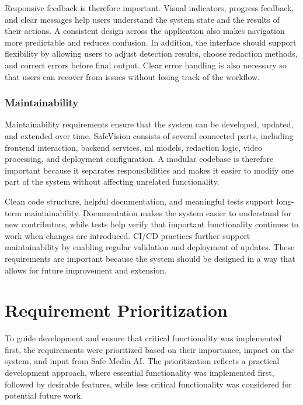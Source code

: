 Responsive feedback is therefore important. Visual indicators, progress feedback, and clear messages help users understand the system state and the results of their actions. A consistent design across the application also makes navigation more predictable and reduces confusion. In addition, the interface should support flexibility by allowing users to adjust detection results, choose redaction methods, and correct errors before final output. Clear error handling is also necessary so that users can recover from issues without losing track of the workflow.

\subsubsection{Maintainability}

Maintainability requirements ensure that the system can be developed, updated, and extended over time. \gls{SafeVision} consists of several connected parts, including frontend interaction, backend services, \acrshort{ml} models, redaction logic, video processing, and deployment configuration. A modular codebase is therefore important because it separates responsibilities and makes it easier to modify one part of the system without affecting unrelated functionality.

Clean code structure, helpful documentation, and meaningful tests support long-term maintainability. Documentation makes the system easier to understand for new contributors, while tests help verify that important functionality continues to work when changes are introduced. CI/CD practices further support maintainability by enabling regular validation and deployment of updates. These requirements are important because the system should be designed in a way that allows for future improvement and extension.


\section{Requirement Prioritization}
\label{sec:priority}

To guide development and ensure that critical functionality was implemented first, the requirements were prioritized based on their importance, impact on the system, and input from Safe Media AI. The prioritization reflects a practical development approach, where essential functionality was implemented first, followed by desirable features, while less critical functionality was considered for potential future work.

